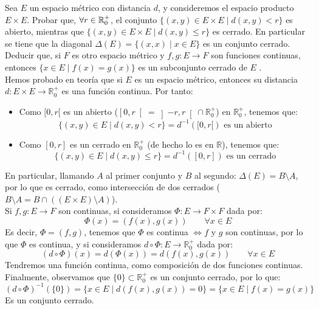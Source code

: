 \begin{ejercicio}
    Sea $E$ un espacio métrico con distancia $d$, y consideremos el espacio producto $E \times E$.
    Probar que, $\forall r \in \mathbb{R}^+_0$, el conjunto $\{(x,y) \in E\times E \mid d(x,y) < r\}$ es abierto, mientras que $\{(x,y) \in E\times E \mid d(x,y) \leq r\}$ es cerrado.
    En particular se tiene que la diagonal $\Delta(E)=\{(x,x)\mid x\in E\}$ es un conjunto cerrado. Deducir que, si $F$ es otro espacio métrico y $f,g: E \to F$ son funciones continuas, entonces $\{x\in E\mid f(x)=g(x)\}$ es un subconjunto cerrado de $E$ .\\

    \noindent
    Hemos probado en teoría que si $E$ es un espacio métrico, entonces su distancia $d:E\times E\to \mathbb{R}^+_0$ es una función continua. Por tanto:
    \begin{itemize}
        \item Como $[0,r[$ es un abierto ($\left[0,r\right[ = \left]-r,r\right[\cap \mathbb{R}^+_0$) en $\mathbb{R}^+_0$, tenemos que:
            \begin{equation*}
                \{(x,y)\in E \mid d(x,y)< r\} = d^{-1}([0,r[) \text{\ es un abierto}
            \end{equation*}
        \item Como $[0,r]$ es un cerrado en $\mathbb{R}^+_0$ (de hecho lo es en $\mathbb{R}$), tenemos que:
            \begin{equation*}
                \{(x,y)\in E \mid d(x,y)\leq r\} = d^{-1}([0,r]) \text{\ es un cerrado}
            \end{equation*}
    \end{itemize}
    En particular, llamando $A$ al primer conjunto y $B$ al segundo: $\Delta(E) = B\setminus A$, por lo que es cerrado, como intersección de dos cerrados ($B\setminus A = B\cap ((E\times E)\setminus A)$).\\

    \noindent
    Si $f,g:E\to F$ son continuas, si consideramos $\Phi:E\to F\times F$ dada por:
    \begin{equation*}
        \Phi(x) = (f(x), g(x)) \qquad \forall x\in E
    \end{equation*}
    Es decir, $\Phi = (f,g)$, tenemos que $\Phi$ es continua $\Longleftrightarrow f$  y $g$ son continuas, por lo que $\Phi$ es continua, y si consideramos $d \circ \Phi:E\to \mathbb{R}^+_0$ dada por:
    \begin{equation*}
        (d\circ \Phi)(x) = d(\Phi(x)) = d(f(x),g(x)) \qquad \forall x\in E
    \end{equation*}
    Tendremos una función continua, como composición de dos funciones continuas. Finalmente, observamos que $\{0\}\subset \mathbb{R}^+_0$ es un conjunto cerrado, por lo que:
    \begin{equation*}
        {(d\circ \Phi)}^{-1}(\{0\}) = \{x\in E \mid d(f(x),g(x)) = 0\} = \{x\in E\mid f(x) = g(x)\}
    \end{equation*}
    Es un conjunto cerrado.
\end{ejercicio}

